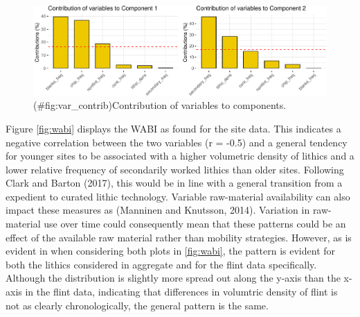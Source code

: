 \documentclass[
]{article}
\begin{document}
\begin{figure}
\centering
\includegraphics{../figures/var_contrib-1.pdf}
\caption{(\#fig:var\_contrib)Contribution of variables to components.}
\end{figure}

Figure \ref{fig:wabi} displays the WABI as found for the site data. This indicates a negative correlation between the two variables (r = -0.5) and a general tendency for younger sites to be associated with a higher volumetric density of lithics and a lower relative frequency of secondarily worked lithics than older sites. Following Clark and Barton (2017), this would be in line with a general transition from a expedient to curated lithic technology. Variable raw-material availability can also impact these measures as (Manninen and Knutsson, 2014). Variation in raw-material use over time could consequently mean that these patterns could be an effect of the available raw material rather than mobility strategies. However, as is evident in when considering both plots in \ref{fig:wabi}, the pattern is evident for both the lithics considered in aggregate and for the flint data specifically. Although the distribution is slightly more spread out along the y-axis than the x-axis in the flint data, indicating that differences in volumtric density of flint is not as clearly chronologically, the general pattern is the same.
\end{document}
